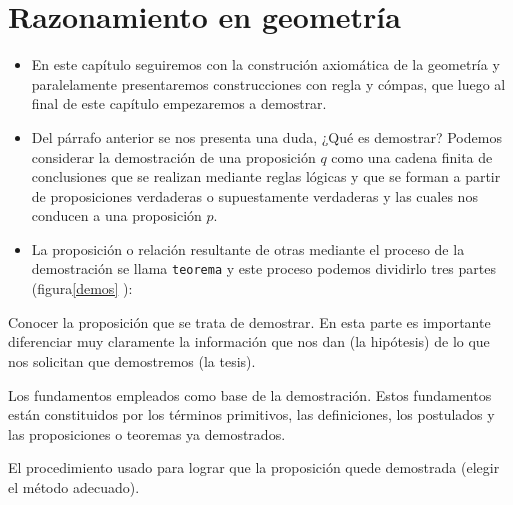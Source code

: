\chapter[
     image=def,%
     image caption={The global option open right, triggers the typesetting of chapter on odd pages only. There are a  couple of layouts that must be typeset on an even pages.}]%
{Razonamiento en geometr\'ia}
{\begin{itemize}
 \item En este cap\'itulo seguiremos con la construci\'on axiomática de la geometr\'ia
y paralelamente presentaremos construcciones con regla y c\'ompas, que luego al
final de este cap\'itulo empezaremos a demostrar.
\item Del párrafo anterior se nos presenta una duda, ¿Qué es demostrar? 
Podemos considerar la demostración de una proposición $q$ como una cadena finita
de conclusiones que se realizan mediante reglas lógicas y que se forman a partir
de proposiciones verdaderas o supuestamente verdaderas y las cuales nos conducen
a una proposición $p$.
\item La proposición o relación resultante de otras mediante el proceso de la
demostración se llama \texttt{teorema} y este proceso podemos dividirlo
tres partes (figura\ref{demos} ):
\end{itemize}
\begin{lista}
\item  Conocer la proposición que se trata de demostrar. En esta parte es
importante diferenciar muy claramente la información que nos dan (la
hipótesis) de lo que nos solicitan que demostremos (la tesis).
\item Los fundamentos empleados como base de la demostración. Estos fundamentos
   están constituidos por los términos primitivos, las definiciones, los
postulados y las proposiciones o teoremas ya demostrados.
\item  El procedimiento usado para lograr que la proposición quede demostrada
(elegir el método adecuado).
\end{lista}}
\label{chap:2}
\vspace{40pt}
